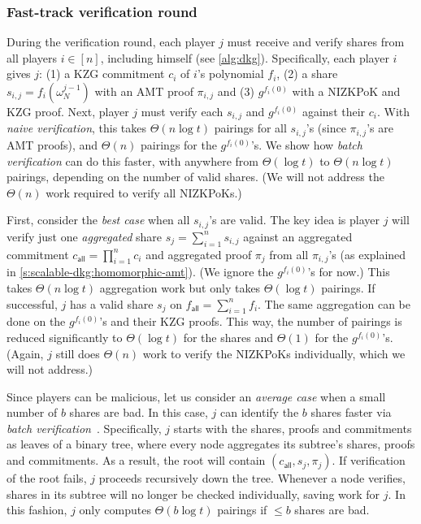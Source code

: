 \subsubsection{Fast-track verification round}
\label{s:scalable-dkg:share-verif}
During the verification round, each player $j$ must receive and verify shares from all players $i\in[n]$, including himself (see \cref{alg:dkg}).
Specifically, each player $i$ gives $j$: (1) a KZG commitment $c_i$ of $i$'s polynomial $f_i$, (2) a share $s_{i,j}=f_i(\omega_N^{j-1})$ with an AMT proof $\pi_{i,j}$ and (3) $g^{f_i(0)}$ with a NIZKPoK and KZG proof.
Next, player $j$ must verify each $s_{i,j}$ and $g^{f_i(0)}$ against their $c_i$.
With \textit{naive verification}, this takes $\Theta(n\log{t})$ pairings for all $s_{i,j}$'s (since $\pi_{i,j}$'s are AMT proofs), and $\Theta(n)$ pairings for the $g^{f_i(0)}$'s.
We show how \textit{batch verification} can do this faster, with anywhere from $\Theta(\log{t})$ to $\Theta(n\log{t})$ pairings, depending on the number of valid shares.
(We will not address the $\Theta(n)$ work required to verify all NIZKPoKs.)

First, consider the \textit{best case} when all $s_{i,j}$'s are valid.
The key idea is player $j$ will verify just one \textit{aggregated} share $s_j = \sum_{i=1}^n s_{i,j}$ against an aggregated commitment $c_\mathsf{all}=\prod_{i=1}^n c_i$ and aggregated proof $\pi_j$ from all $\pi_{i,j}$'s (as explained in \cref{s:scalable-dkg:homomorphic-amt}).
(We ignore the $g^{f_i(0)}$'s for now.)
This takes $\Theta(n\log{t})$ aggregation work but only takes $\Theta(\log{t})$ pairings.
If successful, $j$ has a valid share $s_j$ on $f_\mathsf{all} = \sum_{i=1}^n f_i$.
The same aggregation can be done on the $g^{f_i(0)}$'s and their KZG proofs.
This way, the number of pairings is reduced significantly to $\Theta(\log{t})$ for the shares and $\Theta(1)$ for the $g^{f_i(0)}$'s.
(Again, $j$ still does $\Theta(n)$ work to verify the NIZKPoKs individually, which we will not address.)

Since players can be malicious, let us consider an \textit{average case} when a small number of $b$ shares are bad.
In this case, $j$ can identify the $b$ shares faster via \textit{batch verification}~\cite{Boldyreva2003Threshold}.
Specifically, $j$ starts with the shares, proofs and commitments as leaves of a binary tree, where every node aggregates its subtree's shares, proofs and commitments.
As a result, the root will contain $(c_\mathsf{all},s_j,\pi_j)$.
If verification of the root fails, $j$ proceeds recursively down the tree.
Whenever a node verifies, shares in its subtree will no longer be checked individually, saving work for $j$.
In this fashion, $j$ only computes $\Theta(b\log{t})$ pairings if $\le b$ shares are bad.

